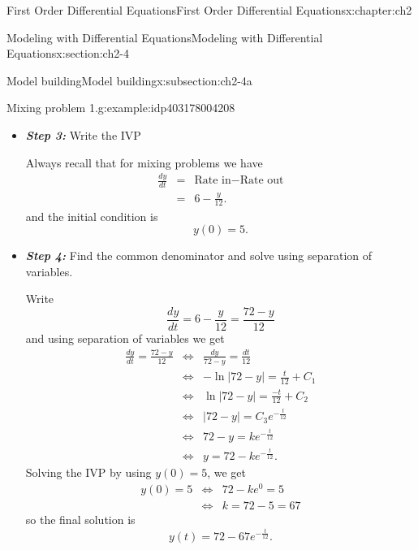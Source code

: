 \documentclass[oneside,10pt,]{book}
\newcommand{\alert}[1]{\textbf{\textit{#1}}}
\numberwithin{equation}{section}
\numberwithin{equation}{section}
\newcommand{\amp}{&}
\begin{document}
\begin{chapterptx}{First Order Differential Equations}{}{First Order Differential Equations}{}{}{x:chapter:ch2}
\begin{sectionptx}{Modeling with Differential Equations}{}{Modeling with Differential Equations}{}{}{x:section:ch2-4}
\begin{subsectionptx}{Model building}{}{Model building}{}{}{x:subsection:ch2-4a}
\begin{example}{Mixing problem 1.}{g:example:idp403178004208}
\begin{itemize}[label=\textbullet]
%
\par
and%
%
\begin{align*}
\mbox{Rate out } \amp = \amp \left(\begin{array}{c}
\mbox{concentrarion}\\
\mbox{of stuff going out}
\end{array}\right)\times\mbox{Rate}\\
\amp = \amp \left(\frac{y(t)}{60} \frac{\mbox{kg}}{\mbox{L}}\right)\times5\frac{\mbox{L}}{\mbox{min}}.\\
\amp = \amp \frac{y(t)}{12}\frac{\mbox{kg}}{\mbox{min}}.
\end{align*}
\item{}\alert{Step 3:} Write the IVP%
\par
Always recall that for mixing problems we have%
\begin{align*}
\frac{dy}{dt} \amp = \amp \mbox{Rate in}-\mbox{Rate out}\\
\amp = \amp 6-\frac{y}{12}.
\end{align*}
and the initial condition is%
\begin{equation*}
y(0)=5.
\end{equation*}
%
\item{}\alert{Step 4:} Find the common denominator and solve using separation of variables.%
\par
Write%
\begin{equation*}
\frac{dy}{dt}=6-\frac{y}{12}=\frac{72-y}{12}
\end{equation*}
and using separation of variables we get%
\begin{align*}
\frac{dy}{dt}=\frac{72-y}{12} \amp \iff \amp \frac{dy}{72-y}=\frac{dt}{12}\\
\amp \iff \amp -\ln\left|72-y\right|=\frac{t}{12}+C_{1}\\
\amp \iff \amp \ln\left|72-y\right|=\frac{-t}{12}+C_{2}\\
\amp \iff \amp \left|72-y\right|=C_{3}e^{-\frac{t}{12}}\\
\amp \iff \amp 72-y=ke^{-\frac{t}{12}}\\
\amp \iff \amp y=72-ke^{-\frac{t}{12}}.
\end{align*}
Solving the IVP by using \(y(0)=5\), we get%
\begin{align*}
y(0)=5 \amp \iff \amp 72-ke^{0}=5\\
\amp \iff \amp k=72-5=67
\end{align*}
so the final solution is%
\begin{equation*}
y(t)=72-67e^{-\frac{t}{12}}.

\end{equation*}
\end{itemize}
\end{example}
\end{subsectionptx}
\end{sectionptx}
\end{chapterptx}
\end{document}

